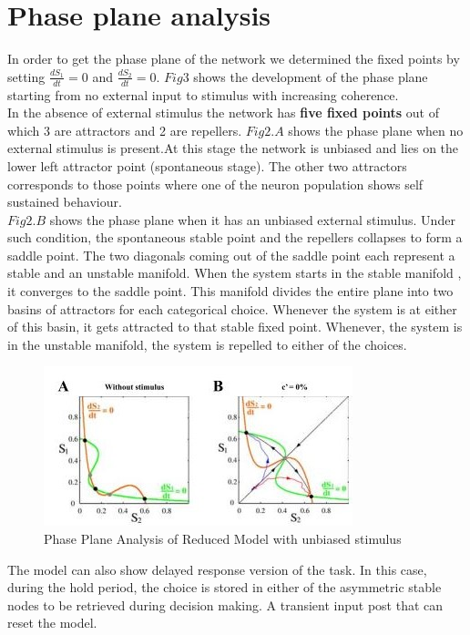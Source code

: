 \section*{Phase plane analysis}

In order to get the phase plane of the network we determined the fixed points by setting $\frac{dS_{1}}{dt} = 0$ and $\frac{dS_{2}}{dt} = 0$. $Fig 3$ shows the development of the phase plane starting from no external input to stimulus with increasing coherence. \\

In the absence of external stimulus the network has \textbf{five fixed points} out of which 3 are attractors and 2 are repellers. $Fig 2.A$ shows the phase plane when no external stimulus is present.At this stage the network is unbiased and lies on the lower left attractor point (spontaneous stage). The other two attractors corresponds to those points where one of the neuron population shows self sustained behaviour.\\

$Fig 2.B$ shows the phase plane when it has an unbiased external stimulus. Under such condition, the spontaneous stable point and the repellers collapses to form a saddle point. The two diagonals coming out of the saddle point each represent a stable and an unstable manifold. When the system starts in the stable manifold , it converges to the saddle point. This manifold divides the entire plane into two basins of attractors for each categorical choice. Whenever the system is at either of this basin, it gets attracted to that stable fixed point. Whenever, the system is in the unstable manifold, the system is repelled to either of the choices.\\
\begin{figure}
  \includegraphics{fig/PhasePlaneAnalysisNoStimulus.jpg}
  \caption{Phase Plane Analysis of Reduced Model with unbiased stimulus}
  \label{fig:Phase Plane Analysis of Reduced Model}
\end{figure}
The model can also show delayed response version of the task. In this case, during the hold period, the choice is stored in either of the asymmetric stable nodes to be retrieved during decision making. A transient input post that can reset the model.

